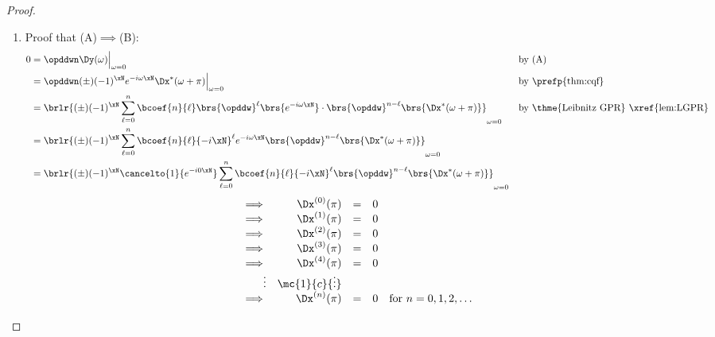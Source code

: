 \begin{proof}
\begin{enumerate}
  \item Proof that (A)$\implies$(B): 
    \begin{align*}
      0
        &= \opddwn\Dy(\omega)\Big|_{\omega=0}
        && \text{by (A)}
      \\&= \opddwn(\pm)(-1)^\xN e^{-i\omega\xN}\Dx^\ast(\omega+\pi)\Big|_{\omega=0}
        && \text{by \prefp{thm:cqf}}
      \\&= \brlr{(\pm)(-1)^\xN \sum_{\ell=0}^n \bcoef{n}{\ell} \brs{\opddw}^\ell\brs{e^{-i\omega\xN}}\cdot\brs{\opddw}^{n-\ell}\brs{\Dx^\ast(\omega+\pi)}}_{\omega=0}
        && \text{by \thme{Leibnitz GPR} \xref{lem:LGPR}}
      \\&= \brlr{(\pm)(-1)^\xN \sum_{\ell=0}^n \bcoef{n}{\ell} {-i\xN}^\ell e^{-i\omega\xN}\brs{\opddw}^{n-\ell}\brs{\Dx^\ast(\omega+\pi)}}_{\omega=0}
      \\&= \brlr{(\pm)(-1)^\xN  \cancelto{1}{e^{-i0\xN}} \sum_{\ell=0}^n \bcoef{n}{\ell} {-i\xN}^\ell \brs{\opddw}^{n-\ell}\brs{\Dx^\ast(\omega+\pi)}}_{\omega=0}
    \end{align*}
  \[\begin{array}{r rcl l}
    \implies & \Dx^{(0)}(\pi) &=& 0 \\
    \implies & \Dx^{(1)}(\pi) &=& 0 \\
    \implies & \Dx^{(2)}(\pi) &=& 0 \\
    \implies & \Dx^{(3)}(\pi) &=& 0 \\
    \implies & \Dx^{(4)}(\pi) &=& 0 \\
    \vdots   & \mc{1}{c}{\vdots}    \\
    \implies & \Dx^{(n)}(\pi) &=& 0 & \text{for $n=0,1,2,\ldots$}
  \end{array}\]


\end{enumerate}
\end{proof}
